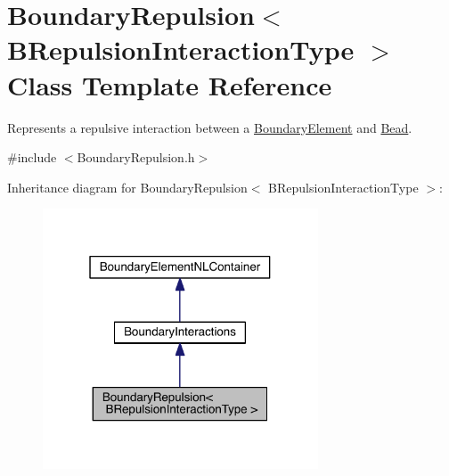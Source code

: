 \hypertarget{classBoundaryRepulsion}{\section{Boundary\+Repulsion$<$ B\+Repulsion\+Interaction\+Type $>$ Class Template Reference}
\label{classBoundaryRepulsion}
}


Represents a repulsive interaction between a \hyperlink{classBoundaryElement}{Boundary\+Element} and \hyperlink{classBead}{Bead}.  




{\ttfamily \#include $<$Boundary\+Repulsion.\+h$>$}



Inheritance diagram for Boundary\+Repulsion$<$ B\+Repulsion\+Interaction\+Type $>$\+:\nopagebreak
\begin{figure}[H]
\begin{center}
\leavevmode
\includegraphics[width=232pt]{classBoundaryRepulsion__inherit__graph}
\end{center}
\end{figure}


